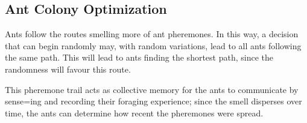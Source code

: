 \documentclass[12pt]{article}
\begin{document}
\subsection{Ant Colony Optimization}
Ants follow the routes smelling more of ant pheremones. In this way, a decision that can begin randomly may, with random variations, lead to all ants following the same path. This will lead to ants finding the shortest path, since the randomness will favour this route.

This pheremone trail acts as collective memory for the ants to communicate by sense=ing and recording their foraging experience; since the smell disperses over time, the ants can determine how recent the pheremones were spread.

\end{document}
